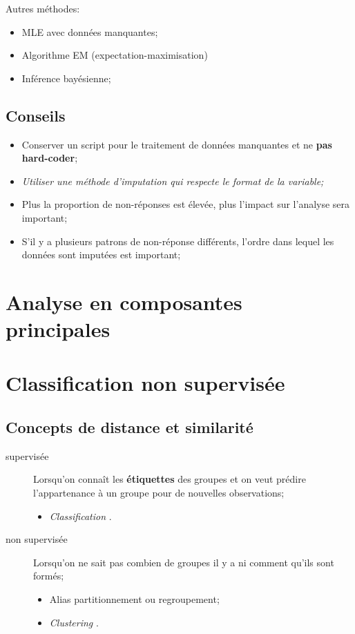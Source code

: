 \documentclass[10pt, french]{article}
\begin{document}
\begin{multicols*}{3}
Autres méthodes:
\begin{itemize}
	\item	MLE avec données manquantes;
	\item	Algorithme EM (expectation-maximisation)
	\item	Inférence bayésienne;
\end{itemize}

\subsection*{Conseils}
\begin{itemize}
	\item	Conserver un script pour le traitement de données manquantes et ne \textbf{pas hard-coder};
	\item	\textit{Utiliser une méthode d'imputation qui respecte le format de la variable;}
	\item	Plus la proportion de non-réponses est élevée, plus l'impact sur l'analyse sera important;
	\item	S'il y a plusieurs patrons de non-réponse différents, l'ordre dans lequel les données sont imputées est important;
\end{itemize}

\section{Analyse en composantes principales}

\section{Classification non supervisée}

\subsection*{Concepts de distance et similarité}

\begin{definitionNOHFILL}[Classification]
\begin{description}
	\item[supervisée]	Lorsqu'on connaît les \textbf{étiquettes} des groupes et on veut prédire l'appartenance à un groupe pour de nouvelles observations;
		\begin{itemize}[leftmargin = *] 
		\item	\og \textit{Classification} \fg{}.
		\end{itemize}
	\item[non supervisée]	Lorsqu'on ne sait pas combien de groupes il y a ni comment qu'ils sont formés;
		\begin{itemize}[leftmargin = *]
		\item	Alias partitionnement ou regroupement;
		\item	\og \textit{Clustering} \fg{}.
		\end{itemize}
\end{description}
\end{definitionNOHFILL}


\end{multicols*}
\end{document}
